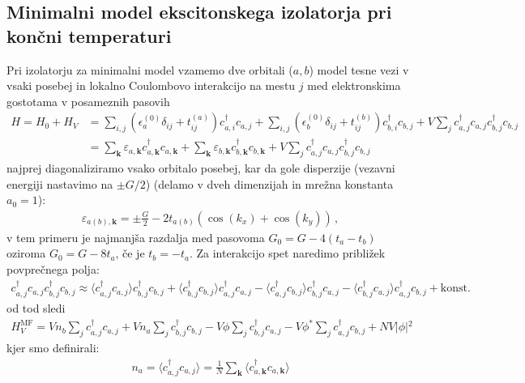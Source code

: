 \documentclass[a4paper,10pt]{article}
\renewcommand{\vec}[1]{\mathbf{#1}}
\begin{document}
\subsection{Minimalni model ekscitonskega izolatorja pri končni temperaturi}
Pri izolatorju za minimalni model vzamemo dve orbitali ($a, b$) model tesne vezi v vsaki posebej in lokalno Coulombovo interakcijo na mestu $j$ med elektronskima gostotama v posameznih pasovih 
\begin{align}
  H = H_0 + H_V &= \sum_{i,j} \left( \epsilon_a^{(0)} \delta_{ij} + t_{ij}^{(a)} \right) c_{a,i}^\dagger c_{a,j} + \sum_{i,j} \left( \epsilon_b^{(0)} \delta_{ij} + t_{ij}^{(b)} \right) c_{b,i}^\dagger c_{b,j} + V \sum_j c_{a,j}^\dagger c_{a,j} c_{b,j}^\dagger c_{b,j} \\
  &= \sum_{\vec{k}} \varepsilon_{a,\vec{k}} c_{a,\vec{k}}^\dagger c_{a,\vec{k}} + \sum_{\vec{k}} \varepsilon_{b,\vec{k}} c_{b,\vec{k}}^\dagger c_{b,\vec{k}} + V \sum_j c_{a,j}^\dagger c_{a,j} c_{b,j}^\dagger c_{b,j}
\end{align}
najprej diagonaliziramo vsako orbitalo posebej, kar da gole disperzije (vezavni energiji nastavimo na $\pm G/2$) (delamo v dveh dimenzijah in mrežna konstanta $a_0=1$): 
\begin{align} \label{free el tb}
  \varepsilon_{a(b),\vec k} = \pm \frac{G}{2} - 2 t_{a(b)}(\cos(k_x) + \cos(k_y))\,,
\end{align}
v tem primeru je najmanjša razdalja med pasovoma $G_0 = G - 4 (t_a -t_b)$ oziroma $G_0=G - 8t_a$, če je $t_b = -t_a$. Za interakcijo spet naredimo približek povprečnega polja: 
\begin{align}
  c_{a,j}^\dagger c_{a,j} c_{b,j}^\dagger c_{b,j} \approx \langle c_{a,j}^\dagger c_{a,j} \rangle c_{b,j}^\dagger c_{b,j} + \langle c_{b,j}^\dagger c_{b,j} \rangle c_{a,j}^\dagger c_{a,j} - \langle c_{a,j}^\dagger c_{b,j} \rangle c_{b,j}^\dagger c_{a,j} - \langle c_{b,j}^\dagger c_{a,j} \rangle c_{a,j}^\dagger c_{b,j} + \text{konst.}
\end{align}
od tod sledi
\begin{align}
  H_V^{\text{MF}} = V n_b \sum_j c_{a,j}^\dagger c_{a,j} + V n_a \sum_j c_{b,j}^\dagger c_{b,j} - V \phi \sum_j c_{b,j}^\dagger c_{a,j} - V \phi^* \sum_j c_{a,j}^\dagger c_{b,j} + N V \vert{}\phi\vert{}^2
\end{align}
kjer smo definirali: 
\begin{align}
  n_a = \langle c_{a,j}^\dagger c_{a,j} \rangle = \frac{1}{N} \sum_{\vec{k}} \langle c_{a,\vec{k}}^\dagger c_{a,\vec{k}} \rangle
\end{align}
\end{document}
